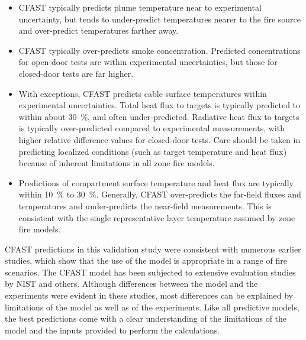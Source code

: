 \begin{itemize}
\item CFAST typically predicts plume temperature near to experimental uncertainty, but tends to under-predict temperatures nearer to the fire source and over-predict temperatures farther away.
\item CFAST typically over-predicts smoke concentration.  Predicted concentrations for open-door tests are within experimental uncertainties, but those for closed-door tests are far higher.
\item With exceptions, CFAST predicts cable surface temperatures within experimental uncertainties.  Total heat flux to targets is typically predicted to within about 30~\%, and often under-predicted.  Radiative heat flux to targets is typically over-predicted compared to experimental measurements, with higher relative difference values for closed-door tests.  Care should be taken in predicting localized conditions (such as target temperature and heat flux) because of inherent limitations in all zone fire models.
\item Predictions of compartment surface temperature and heat flux are typically within 10~\% to 30~\%.  Generally, CFAST over-predicts the far-field fluxes and temperatures and under-predicts the near-field measurements.  This is consistent with the single representative layer temperature assumed by zone fire models.
\end{itemize}

CFAST predictions in this validation study were consistent with numerous earlier studies, which show that the use of the model is appropriate in a range of fire scenarios.  The CFAST model has been subjected to extensive evaluation studies by NIST and others.  Although differences between the model and the experiments were evident in these studies, most differences can be explained by limitations of the model as well as of the experiments.  Like all predictive models, the best predictions come with a clear understanding of the limitations of the model and the inputs provided to perform the calculations.